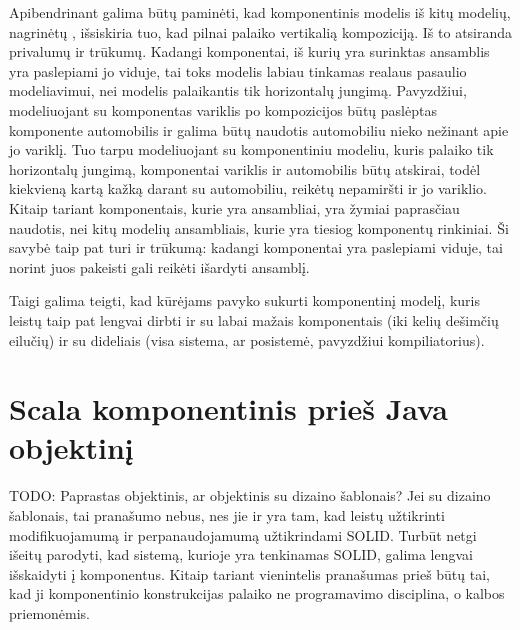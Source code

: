 Apibendrinant galima būtų paminėti, kad  komponentinis
modelis iš kitų modelių, nagrinėtų
\cite{classification-framework-for-scm}, išsiskiria tuo, kad
pilnai palaiko vertikalią kompoziciją. Iš to atsiranda privalumų
ir trūkumų. Kadangi komponentai, iš kurių yra surinktas ansamblis
yra paslepiami jo viduje, tai toks modelis labiau tinkamas realaus
pasaulio modeliavimui, nei modelis palaikantis tik horizontalų jungimą.
Pavyzdžiui, modeliuojant su  komponentas variklis po
kompozicijos būtų paslėptas komponente automobilis ir galima būtų
naudotis automobiliu nieko nežinant apie jo variklį. Tuo tarpu
modeliuojant su komponentiniu modeliu, kuris palaiko tik horizontalų
jungimą, komponentai variklis ir automobilis būtų atskirai, todėl
kiekvieną kartą kažką darant su automobiliu, reikėtų nepamiršti
ir jo variklio. Kitaip tariant  komponentais, kurie
yra ansambliai, yra žymiai paprasčiau naudotis, nei kitų modelių
ansambliais, kurie yra tiesiog komponentų rinkiniai. Ši savybė taip
pat turi ir trūkumą: kadangi komponentai yra paslepiami viduje, tai
norint juos pakeisti gali reikėti išardyti ansamblį.


Taigi galima teigti, kad  kūrėjams pavyko sukurti
komponentinį modelį, kuris leistų taip pat lengvai dirbti ir
su labai mažais komponentais (iki kelių dešimčių eilučių) ir su
dideliais (visa sistema, ar posistemė, pavyzdžiui 
kompiliatorius).

\section{Scala komponentinis prieš Java objektinį}

TODO: Paprastas objektinis, ar objektinis su dizaino šablonais? Jei su
dizaino šablonais, tai pranašumo nebus, nes jie ir yra tam, kad
leistų užtikrinti modifikuojamumą ir perpanaudojamumą užtikrindami
SOLID. Turbūt netgi išeitų parodyti, kad sistemą, kurioje yra
tenkinamas SOLID, galima lengvai išskaidyti į komponentus.
Kitaip tariant vienintelis  pranašumas prieš
 būtų tai, kad ji komponentinio konstrukcijas
palaiko ne programavimo disciplina, o kalbos priemonėmis.

